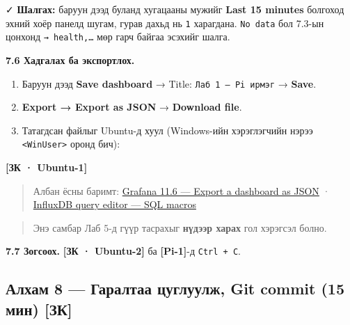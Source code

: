 ✓ \textbf{Шалгах:} баруун дээд буланд хугацааны мужийг \textbf{Last 15 minutes} болгоход эхний хоёр панелд шугам, гурав дахьд нь \texttt{1} харагдана. \texttt{No\ data} бол 7.3-ын цонхонд \texttt{→\ health,\ldots{}} мөр гарч байгаа эсэхийг шалга.

\textbf{7.6 Хадгалах ба экспортлох.}

\begin{enumerate}
\def\labelenumi{\arabic{enumi}.}
\tightlist
\item
  Баруун дээд \textbf{Save dashboard} → Title: \texttt{Лаб\ 1\ —\ Pi\ ирмэг} → \textbf{Save}.
\item
  \textbf{Export → Export as JSON} → \textbf{Download file}.
\item
  Татагдсан файлыг Ubuntu-д хуул (Windows-ийн хэрэглэгчийн нэрээ \texttt{\textless{}WinUser\textgreater{}} оронд бич):
\end{enumerate}

\textbf{{[}ЗК · Ubuntu-1{]}}

\begin{Shaded}
\begin{Highlighting}[]
\OperatorTok{\textless{}}\OperatorTok{\textgreater{}}
\end{Highlighting}
\end{Shaded}

\begin{quote}
Албан ёсны баримт: \href{https://grafana.com/docs/grafana/v11.6/dashboards/share-dashboards-panels/}{Grafana 11.\allowbreak{}6 --- Export a dashboard as JSON} · \href{https://grafana.com/docs/grafana/v11.6/datasources/influxdb/query-editor/}{InfluxDB query editor --- SQL macros}
\end{quote}

\begin{quote}
Энэ самбар Лаб 5-д гүүр тасрахыг \textbf{нүдээр харах} гол хэрэгсэл болно.
\end{quote}

\textbf{7.7 Зогсоох.} \textbf{{[}ЗК · Ubuntu-2{]}} ба \textbf{{[}Pi-1{]}}-д \texttt{Ctrl\ +\ C}.

\hypertarget{ux430ux43bux445ux430ux43c-8-ux433ux430ux440ux430ux43bux442ux430ux430-ux446ux443ux433ux43bux443ux443ux43bux436-git-commit-15-ux43cux438ux43d-ux437ux43a}{%
\subsection{Алхам 8 --- Гаралтаа цуглуулж, Git commit (15 мин) {[}ЗК{]}}\label{ux430ux43bux445ux430ux43c-8-ux433ux430ux440ux430ux43bux442ux430ux430-ux446ux443ux433ux43bux443ux443ux43bux436-git-commit-15-ux43cux438ux43d-ux437ux43a}}


